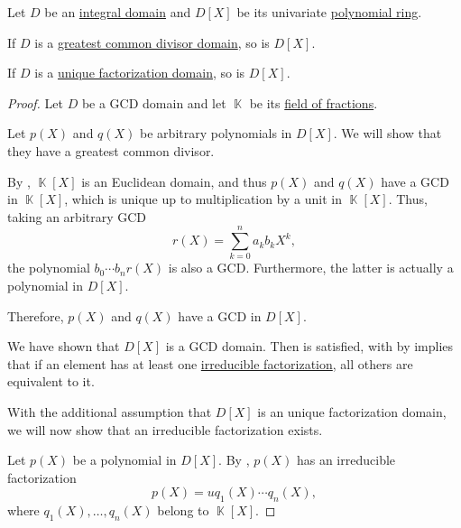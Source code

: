 \begin{proposition}\label{thm:polynomial_ring_of_field_of_fractions}
  Let \( D \) be an \hyperref[def:integral_domain]{integral domain} and \( D[X] \) be its univariate \hyperref[def:polynomial_ring]{polynomial ring}.

  \begin{thmenum}
     If \( D \) is a \hyperref[def:greatest_common_divisor_domain]{greatest common divisor domain}, so is \( D[X] \).

     If \( D \) is a \hyperref[def:unique_factorization_domain]{unique factorization domain}, so is \( D[X] \).
  \end{thmenum}
\end{proposition}
\begin{proof}
  Let \( D \) be a GCD domain and let \( \BbbK \) be its \hyperref[thm:field_of_fractions]{field of fractions}.

   Let \( p(X) \) and \( q(X) \) be arbitrary polynomials in \( D[X] \). We will show that they have a greatest common divisor.

  By , \( \BbbK[X] \) is an Euclidean domain, and thus \( p(X) \) and \( q(X) \) have a GCD in \( \BbbK[X] \), which is unique up to multiplication by a unit in \( \BbbK[X] \). Thus, taking an arbitrary GCD
  \begin{equation*}
    r(X) = \sum_{k=0}^n {a_k} {b_k} X^k,
  \end{equation*}
  the polynomial \( b_0 \cdots b_n r(X) \) is also a GCD. Furthermore, the latter is actually a polynomial in \( D[X] \).

  Therefore, \( p(X) \) and \( q(X) \) have a GCD in \( D[X] \).

   We have shown that \( D[X] \) is a GCD domain. Then  is satisfied, with by  implies that if an element has at least one \hyperref[def:irreducible_factorizaion]{irreducible factorization}, all others are equivalent to it.

  With the additional assumption that \( D[X] \) is an unique factorization domain, we will now show that an irreducible factorization exists.

  Let \( p(X) \) be a polynomial in \( D[X] \). By , \( p(X) \) has an irreducible factorization
  \begin{equation*}
    p(X) = u q_1(X) \cdots q_n(X),
  \end{equation*}
  where \( q_1(X), \ldots, q_n(X) \) belong to \( \BbbK[X] \).


\end{proof}
